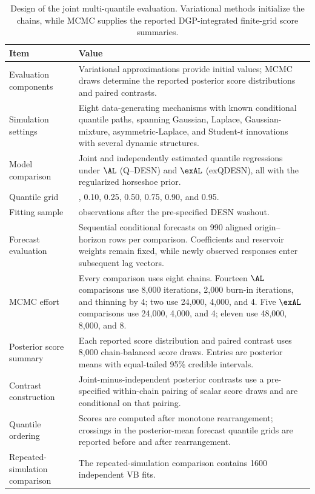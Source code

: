 \begin{table}[!htbp]
\centering
\small
\begin{tabular}{@{}>{\raggedright\arraybackslash}p{}>{\raggedright\arraybackslash}p{}@{}}
\toprule
Item & Value
\\
\midrule
Evaluation components & Variational approximations provide initial values; MCMC draws determine the reported posterior score distributions and paired contrasts. \\
Simulation settings & Eight data-generating mechanisms with known conditional quantile paths, spanning Gaussian, Laplace, Gaussian-mixture, asymmetric-Laplace, and Student-\(t\) innovations with several dynamic structures. \\
Model comparison & Joint and independently estimated quantile regressions under \(\AL\) (Q--DESN) and \(\exAL\) (exQDESN), all with the regularized horseshoe prior. \\
Quantile grid & 0.05, 0.10, 0.25, 0.50, 0.75, 0.90, and 0.95. \\
Fitting sample & 500 observations after the pre-specified DESN washout. \\
Forecast evaluation & Sequential conditional forecasts on 990 aligned origin--horizon rows per comparison. Coefficients and reservoir weights remain fixed, while newly observed responses enter subsequent lag vectors. \\
MCMC effort & Every comparison uses eight chains. Fourteen \(\AL\) comparisons use 8,000 iterations, 2,000 burn-in iterations, and thinning by 4; two use 24,000, 4,000, and 4. Five \(\exAL\) comparisons use 24,000, 4,000, and 4; eleven use 48,000, 8,000, and 8. \\
Posterior score summary & Each reported score distribution and paired contrast uses 8,000 chain-balanced score draws. Entries are posterior means with equal-tailed 95\% credible intervals. \\
Contrast construction & Joint-minus-independent posterior contrasts use a pre-specified within-chain pairing of scalar score draws and are conditional on that pairing. \\
Quantile ordering & Scores are computed after monotone rearrangement; crossings in the posterior-mean forecast quantile grids are reported before and after rearrangement. \\
Repeated-simulation comparison & The repeated-simulation comparison contains 1600 independent VB fits. \\
\bottomrule
\end{tabular}
\caption{Design of the joint multi-quantile evaluation. Variational methods initialize the chains, while MCMC supplies the reported DGP-integrated finite-grid score summaries.}
\label{tab:joint-qdesn-article-validation-mcmc-balanced-protocol}
\end{table}
